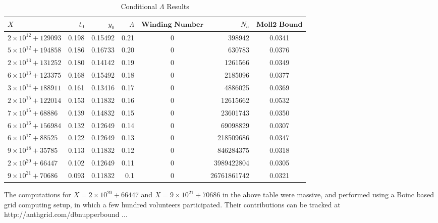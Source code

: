\begin{table}[h!]
  \begin{center}
    \caption{Conditional $\Lambda$ Results}
    \label{tab:table1}
    \begin{tabular}{l|r|r|r|c|r|c} %
      $X$ & $t_{0}$ & $y_{0}$ & $\Lambda$ & $\textbf{Winding Number}$ & $N_{a}$ & $\textbf{Moll2 Bound}$\\
      \hline
      $2 \times 10^{12} + 129093$ & 0.198 & 0.15492 & 0.21 & 0 & 398942 & 0.0341\\
      $5 \times 10^{12} + 194858$ & 0.186 & 0.16733 & 0.20 & 0 & 630783 & 0.0376\\
      $2 \times 10^{13} + 131252$ & 0.180 & 0.14142 & 0.19 & 0 & 1261566 & 0.0349\\
      $6 \times 10^{13} + 123375$ & 0.168 & 0.15492 & 0.18 & 0 & 2185096 & 0.0377\\
      $3 \times 10^{14} + 188911$ & 0.161 & 0.13416 & 0.17 & 0 & 4886025 & 0.0369\\
      $2 \times 10^{15} + 122014$ & 0.153 & 0.11832 & 0.16 & 0 & 12615662 & 0.0532\\
      $7 \times 10^{15} + 68886$ & 0.139 & 0.14832 & 0.15 & 0 & 23601743 & 0.0350\\
      $6 \times 10^{16} + 156984$ & 0.132 & 0.12649 & 0.14 & 0 & 69098829 & 0.0307\\
      $6 \times 10^{17} + 88525$ & 0.122 & 0.12649 & 0.13 & 0 & 218509686 & 0.0347\\
      $9 \times 10^{18} + 35785$ & 0.113 & 0.11832 & 0.12 & 0 & 846284375 & 0.0318\\
      $2 \times 10^{20} + 66447$ & 0.102 & 0.12649 & 0.11 & 0 & 3989422804 & 0.0305\\
      $9 \times 10^{21} + 70686$ & 0.093 & 0.11832 & 0.1 & 0 & 26761861742 & 0.0321\\
    \end{tabular}
  \end{center}
\end{table}

The computations for $X=2 \times 10^{20} + 66447$ and $X=9 \times 10^{21} + 70686$ in the above table were massive, and performed using a Boinc based grid computing setup, in which a few hundred volunteers participated. Their contributions can be tracked at http://anthgrid.com/dbnupperbound
...

